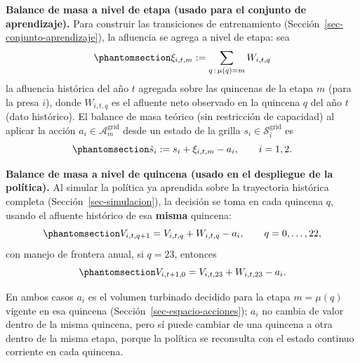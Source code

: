 \documentclass[
  spanish,
  letterpaper,
]{scrreprt}
\theoremstyle{definition}
\theoremstyle{remark}
\begin{document}
\textbf{Balance de masa a nivel de etapa (usado para el conjunto de
aprendizaje).} Para construir las transiciones de entrenamiento
(Sección~\ref{sec-conjunto-aprendizaje}), la afluencia se agrega a nivel
de etapa: sea
\begin{equation}\protect\phantomsection\label{eq-afluencia-etapa}{\xi_{i,t,m} := \sum_{q\,:\,\mu(q)=m} W_{i,t,q}}\end{equation}
la afluencia histórica del año \(t\) agregada sobre las quincenas de la
etapa \(m\) (para la presa \(i\)), donde \(W_{i,t,q}\) es el afluente
neto observado en la quincena \(q\) del año \(t\) (dato histórico). El
balance de masa teórico (sin restricción de capacidad) al aplicar la
acción \(a_i\in\mathcal A_m^{\text{grid}}\) desde un estado de la grilla
\(s_i\in\mathcal S_i^{\text{grid}}\) es
\begin{equation}\protect\phantomsection\label{eq-transicion}{\tilde s_i := s_i + \xi_{i,t,m} - a_i, \qquad i=1,2.}\end{equation}

\textbf{Balance de masa a nivel de quincena (usado en el despliegue de
la política).} Al simular la política ya aprendida sobre la trayectoria
histórica completa (Sección~\ref{sec-simulacion}), la decisión se toma
en cada quincena \(q\), usando el afluente histórico de esa
\textbf{misma} quincena:
\begin{equation}\protect\phantomsection\label{eq-transicion-quincenal}{V_{i,t,q+1} = V_{i,t,q} + W_{i,t,q} - a_i, \qquad q=0,\dots,22,}\end{equation}
con manejo de frontera anual, si \(q=23\), entonces\\

\begin{equation}\protect\phantomsection\label{eq-transicion23}{V_{i,t+1,0} = V_{i,t,23} + W_{i,t,23} - a_i.}\end{equation}

En ambos casos \(a_i\) es el volumen turbinado decidido para la etapa
\(m=\mu(q)\) vigente en esa quincena
(Sección~\ref{sec-espacio-acciones}); \(a_i\) no cambia de valor dentro
de la misma quincena, pero sí puede cambiar de una quincena a otra
dentro de la misma etapa, porque la política se reconsulta con el estado
continuo corriente en cada quincena.
\end{document}
